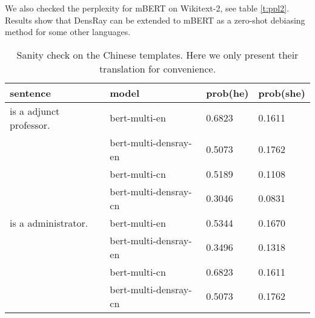 We also checked the perplexity for mBERT on Wikitext-2, see table \ref{t:ppl2}. Results show that DensRay can be extended to mBERT as a zero-shot debiasing method for some other languages.

\begin{table*}[t]
\centering
\begin{tabular}{llll}
\hline
sentence & model & prob(he) & prob(she)\\
\hline
[MASK] is a adjunct professor. & bert-multi-en & 0.6823 & 0.1611\\
 & bert-multi-densray-en & 0.5073 & 0.1762\\
& bert-multi-cn & 0.5189 & 0.1108\\
 & bert-multi-densray-cn & 0.3046 & 0.0831\\
\hline
[MASK] is a administrator. & bert-multi-en & 0.5344 & 0.1670\\
 & bert-multi-densray-en & 0.3496 & 0.1318\\
& bert-multi-cn & 0.6823 & 0.1611\\
 & bert-multi-densray-cn & 0.5073 & 0.1762\\
\hline
\end{tabular}
\caption{\label{t:templates3}
Sanity check on the Chinese templates. Here we only present their translation for convenience.}
\end{table*}